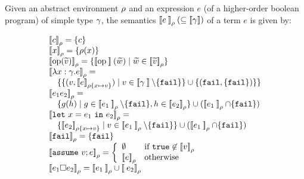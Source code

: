 Given an abstract environment \(\rho\) and an expression \(e\) (of a higher-order boolean program)
of simple type \(\gamma\), 
the semantics \(\mathbin{[\![}e\mathbin{]\!]}_{\rho} (\subseteq \mathbin{[\![}\gamma\mathbin{]\!]})\) of a term \(e\) is given by:

\[
\begin{array}{l}
\esem{c}{\env} = \set{c}\\
\esem{x}{\env} = \set{\env(x)}\\
\esem{\OP(\seq{v})}{\env} = \set{\sem{\OP}(\seq{w}) \mid \seq{w}\in \esem{\seq{v}}{\env}}\\
\esem{\lambda x:\st.e}{\env} = \\
\quad      \{\set{(v,\esem{e}{\env\set{{x}\mapsto {v}}}) \mid {v}\in \sem{\st}\setminus\set{\FAIL}}
          \cup \set{(\FAIL,\set{\FAIL})}\}\\
\esem{e_1 e_2}{\env} =\\
\quad     \set{g(h) \mid g\in \esem{e_1}{\env}\setminus\set{\FAIL}, h\in \esem{e_2}{\env}}
    \cup (\esem{e_1}{\env}\cap \set{\FAIL})\\
\esem{\LETEQIN{x}{e_1}{e_2}}{\env} =\\
\quad      \set{\esem{e_2}{\env\set{x\mapsto v}} \mid v\in \esem{e_1}{\env}\setminus\set{\FAIL}}
     \cup (\esem{e_1}{\env}\cap \set{\FAIL})\\
\esem{\FAIL}{\env} = \set{\FAIL}\\
\esem{\ASSUME{v}{e}}{\env} = 
  \left\{\begin{array}{ll}
       \emptyset  & \mbox{if \(\TRUE\not\in \esem{v}{\env}\)}\\
      \esem{e}{\env} & \mbox{otherwise}
     \end{array}
  \right.\\
\esem{e_1\PAROP e_2}{\env} =
      \esem{e_1}{\env} \cup \esem{e_2}{\env}\\
\end{array}
\]


